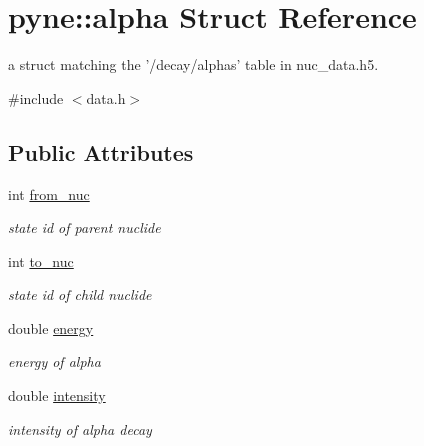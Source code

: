\hypertarget{structpyne_1_1alpha}{\section{pyne\+:\+:alpha Struct Reference}
\label{structpyne_1_1alpha}
}


a struct matching the '/decay/alphas' table in nuc\+\_\+data.\+h5.  




{\ttfamily \#include $<$data.\+h$>$}

\subsection*{Public Attributes}
\begin{DoxyCompactItemize}
\item 
\hypertarget{structpyne_1_1alpha_af41fd4e97378d30f3fbc9f01999b2d2a}{int \hyperlink{structpyne_1_1alpha_af41fd4e97378d30f3fbc9f01999b2d2a}{from\+\_\+nuc}}\label{structpyne_1_1alpha_af41fd4e97378d30f3fbc9f01999b2d2a}

\begin{DoxyCompactList}\small\item\em state id of parent nuclide \end{DoxyCompactList}\item 
\hypertarget{structpyne_1_1alpha_ab099ce46072d7022caf1a49de2e0974b}{int \hyperlink{structpyne_1_1alpha_ab099ce46072d7022caf1a49de2e0974b}{to\+\_\+nuc}}\label{structpyne_1_1alpha_ab099ce46072d7022caf1a49de2e0974b}

\begin{DoxyCompactList}\small\item\em state id of child nuclide \end{DoxyCompactList}\item 
\hypertarget{structpyne_1_1alpha_a5f1aa6a1d0e8c02a0967ee160e35fdb2}{double \hyperlink{structpyne_1_1alpha_a5f1aa6a1d0e8c02a0967ee160e35fdb2}{energy}}\label{structpyne_1_1alpha_a5f1aa6a1d0e8c02a0967ee160e35fdb2}

\begin{DoxyCompactList}\small\item\em energy of alpha \end{DoxyCompactList}\item 
\hypertarget{structpyne_1_1alpha_a56e40c800fbe36f1d62113ddf4c162e7}{double \hyperlink{structpyne_1_1alpha_a56e40c800fbe36f1d62113ddf4c162e7}{intensity}}\label{structpyne_1_1alpha_a56e40c800fbe36f1d62113ddf4c162e7}

\begin{DoxyCompactList}\small\item\em intensity of alpha decay \end{DoxyCompactList}\end{DoxyCompactItemize}



